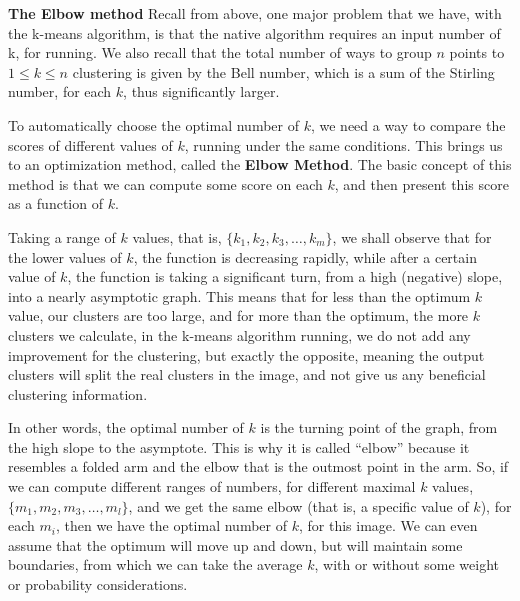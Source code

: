 \documentclass[12pt]{article}
\begin{document}
\textbf{The Elbow method}
Recall from above, one major problem that we have, with the k-means algorithm, is that the native algorithm requires an input number of k, for running. We also recall that the total number of ways to group \( n \) points to \( 1 \leq k \leq n \) clustering is given by the Bell number, which is a sum of the Stirling number, for each \( k \), thus significantly larger. \newline

To automatically choose the optimal number of \( k \), we need a way to compare the scores of different values of \( k \), running under the same conditions. This brings us to an optimization method, called the \textbf{Elbow Method}. The basic concept of this method is that we can compute some score on each \( k \), and then present this score as a function of \( k \). \newline

Taking a range of \( k \) values, that is, \( \{k_1,k_2,k_3,…,k_m \} \), we shall observe that for the lower values of \( k \), the function is decreasing rapidly, while after a certain value of \( k \), the function is taking a significant turn, from a high (negative) slope, into a nearly asymptotic graph. 
This means that for less than the optimum \( k \) value, our clusters are too large, and for more than the optimum, the more \( k \) clusters we calculate, in the k-means algorithm running, we do not add any improvement for the clustering, but exactly the opposite, meaning the output clusters will split the real clusters in the image, and not give us any beneficial clustering information. \newline

In other words, the optimal number of \( k \) is the turning point of the graph, from the high slope to the asymptote. This is why it is called “elbow” because it resembles a folded arm and the elbow that is the outmost point in the arm. So, if we can compute different ranges of numbers, for different maximal \( k \) values, \( \{m_1,m_2,m_3,…,m_l \} \), and we get the same elbow (that is, a specific value of \( k \)), for each \( m_i \), then we have the optimal number of \( k \), for this image. We can even assume that the optimum will move up and down, but will maintain some boundaries, from which we can take the average \( k \), with or without some weight or probability considerations. \newline
\end{document}
